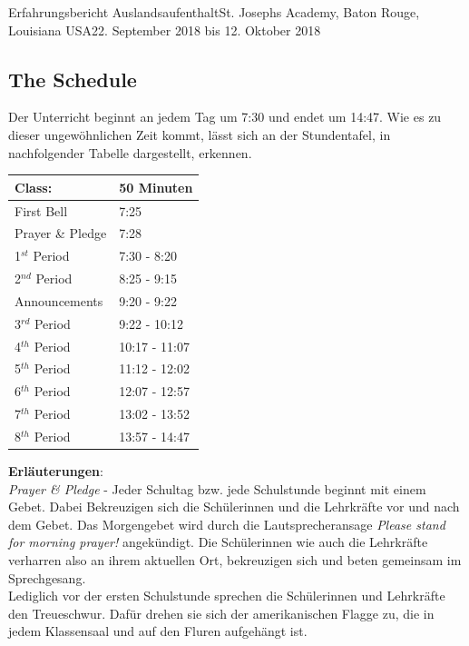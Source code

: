 \documentclass[oneside,openany,headings=optiontotoc,11pt,numbers=noenddot]{article}
\begin{document}
\begin{worksheet}{Erfahrungsbericht Auslandsaufenthalt}{St. Joseph\grq{}s Academy, Baton Rouge, Louisiana USA}{22. September 2018 bis 12. Oktober 2018}
		\subsection{The Schedule}
		Der Unterricht beginnt an jedem Tag um 7:30 und endet um 14:47. Wie es zu dieser ungewöhnlichen Zeit kommt, lässt sich an der Stundentafel, in nachfolgender Tabelle dargestellt, erkennen.\\
		\begin{center}
			\tiny
			\begin{tabularx}{0.5\textwidth}{X|X}
				Class: & 50 Minuten\\
				\hline
				\hline
				First Bell & 7:25\\
				Prayer \& Pledge & 7:28\\
				\hline
				1\(^{st}\) Period & 7:30 - 8:20\\
				2\(^{nd}\) Period & 8:25 - 9:15\\
				\hline
				Announcements & 9:20 - 9:22\\
				\hline
				3\(^{rd}\) Period & 9:22 - 10:12\\
				4\(^{th}\) Period & 10:17 - 11:07\\
				5\(^{th}\) Period & 11:12 - 12:02\\
				6\(^{th}\) Period & 12:07 - 12:57\\
				7\(^{th}\) Period & 13:02 - 13:52\\
				8\(^{th}\) Period & 13:57 - 14:47
			\end{tabularx}
		\end{center}
		\normalsize
		\small{\textbf{Erläuterungen}:\\
			\indent
			\textit{Prayer \& Pledge} - Jeder Schultag bzw. jede Schulstunde beginnt mit einem Gebet. Dabei Bekreuzigen sich die Schülerinnen und die Lehrkräfte vor und nach dem Gebet. Das Morgengebet wird durch die Lautsprecheransage \glqq{}\textit{Please stand for morning prayer!}\grqq{} angekündigt. Die Schülerinnen wie auch die Lehrkräfte verharren also an ihrem aktuellen Ort, bekreuzigen sich und beten gemeinsam im Sprechgesang.\\
			Lediglich vor der ersten Schulstunde sprechen die Schülerinnen und Lehrkräfte den Treueschwur. Dafür drehen sie sich der amerikanischen Flagge zu, die in jedem Klassensaal und auf den Fluren aufgehängt ist.
			\begin{center}
				\begin{minipage}{0.7\textwidth}
					\begin{center}
						\tiny
						

\end{center}
\end{minipage}
\end{center}}
\end{worksheet}
\end{document}
